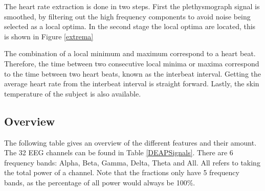 
The heart rate extraction is done in two steps. First the plethysmograph signal is smoothed, by filtering out the high frequency components to avoid noise being selected as a local optima. In the second stage the local optima are located, this is shown in Figure \ref{extrema}


\npar

The combination of a local minimum and maximum correspond to a heart beat\citep{DEAP}. Therefore, the time between two consecutive local minima or maxima correspond to the time between two heart beats, known as the interbeat interval. Getting the average heart rate from the interbeat interval is straight forward. Lastly, the skin temperature of the subject is also available.

\subsection{Overview}

The following table gives an overview of the different features and their amount. The 32 EEG channels can be found in Table \ref{DEAPSignals}. There are 6 frequency bands: Alpha, Beta, Gamma, Delta, Theta and All. All refers to taking the total power of a channel. Note that the fractions only have 5 frequency bands, as the percentage of all power would always be 100$\%$. 

